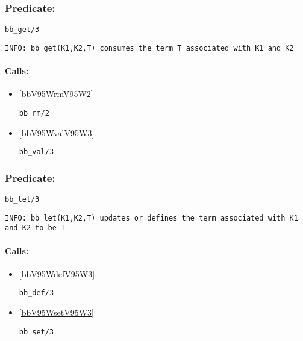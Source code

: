 \subsubsection{Predicate:} \label{bbV95WgetV95W3}

\begin{verbatim}
bb_get/3
\end{verbatim}

{\small \begin{verbatim}
INFO: bb_get(K1,K2,T) consumes the term T associated with K1 and K2

\end{verbatim}}
\paragraph{Calls:} 
\begin{itemize}
\item \ref{bbV95WrmV95W2} 
\begin{verbatim}
bb_rm/2
\end{verbatim}

\item \ref{bbV95WvalV95W3} 
\begin{verbatim}
bb_val/3
\end{verbatim}

\end{itemize}

\subsubsection{Predicate:} \label{bbV95WletV95W3}

\begin{verbatim}
bb_let/3
\end{verbatim}

{\small \begin{verbatim}
INFO: bb_let(K1,K2,T) updates or defines the term associated with K1 and K2 to be T

\end{verbatim}}
\paragraph{Calls:} 
\begin{itemize}
\item \ref{bbV95WdefV95W3} 
\begin{verbatim}
bb_def/3
\end{verbatim}

\item \ref{bbV95WsetV95W3} 
\begin{verbatim}
bb_set/3
\end{verbatim}

\end{itemize}
